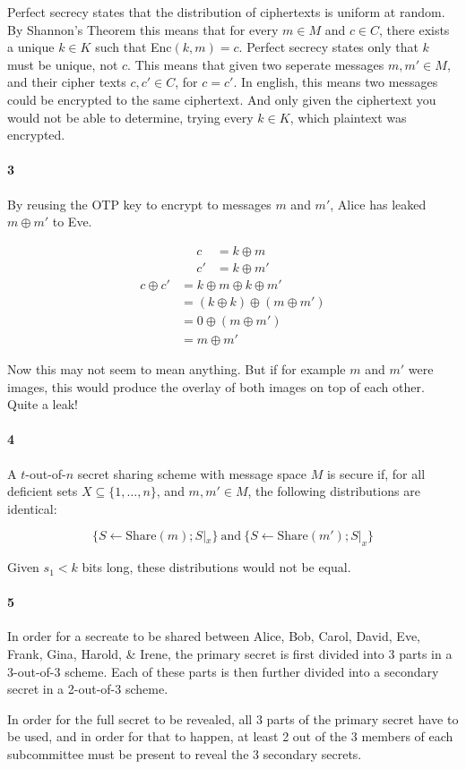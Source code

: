 \documentclass[12pt]{article}
\begin{document}
Perfect secrecy states that the distribution of ciphertexts is uniform
at random. By Shannon's Theorem this means that for every $m \in M$ and
$c \in C$, there exists a unique $k \in K$ such that Enc$(k, m) = c$.
Perfect secrecy states only that $k$ must be unique, not $c$.
This means that given two seperate messages $m, m' \in M$, and their
cipher texts $c, c' \in C$, for $c = c'$. In english, this means two
messages could be encrypted to the same ciphertext. And only given the
ciphertext you would not be able to determine, trying every $k \in K$,
which plaintext was encrypted.

\paragraph{3}

By reusing the OTP key to encrypt to messages $m$ and $m'$, Alice has
leaked $m \oplus m'$ to Eve.

\begin{align*}
    c &= k \oplus m\\
    c' &= k \oplus m'
\end{align*}
\begin{align*}
    c \oplus c' &= k \oplus m \oplus k \oplus m'\\
                &= (k \oplus k) \oplus (m \oplus m')\\
                &= 0 \oplus (m \oplus m')\\
                &= m \oplus m'
\end{align*}

Now this may not seem to mean anything. But if for example $m$ and $m'$
were images, this would produce the overlay of both images on top of
each other. Quite a leak!

\paragraph{4}

A $t$-out-of-$n$ secret sharing scheme with message space $M$ is secure
if, for all deficient sets $X \subseteq \{1,\dots,n\}$, and $m, m' \in M$, the
following distributions are identical:

\[
    \{S \gets \text{Share}(m);S|_{x}\} \: \text{and} \: \{S \gets \text{Share}(m');S|_{x}\}
\]

Given $s_1 < k$ bits long, these distributions would not be equal.


\paragraph{5}

In order for a secreate to be shared between Alice, Bob, Carol, David,
Eve, Frank, Gina, Harold, \& Irene, the primary secret is first divided
into 3 parts in a 3-out-of-3 scheme. Each of these parts is then further
divided into a secondary secret in a 2-out-of-3 scheme.

In order for the full secret to be revealed, all 3 parts of the primary
secret have to be used, and in order for that to happen,
at least 2 out of the 3 members of each subcommittee must be
present to reveal the 3 secondary secrets.
\end{document}
